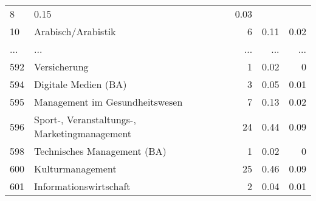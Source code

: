 \begin{longtable}{lXrrr}
          \num{8} &
          \num[round-mode=places,round-precision=2]{0,15} &
          \num[round-mode=places,round-precision=2]{0,03} \\
        10 & \multicolumn{1}{X}{Arabisch/Arabistik} & %
          \num{6} &
          \num[round-mode=places,round-precision=2]{0,11} &
          \num[round-mode=places,round-precision=2]{0,02} \\
       ... & ... & ... & ... & ... \\
        592 & \multicolumn{1}{X}{Versicherung} & %
          \num{1} &
          \num[round-mode=places,round-precision=2]{0,02} &
          \num[round-mode=places,round-precision=2]{0} \\

        594 & \multicolumn{1}{X}{Digitale Medien (BA)} & %
          \num{3} &
          \num[round-mode=places,round-precision=2]{0,05} &
          \num[round-mode=places,round-precision=2]{0,01} \\

        595 & \multicolumn{1}{X}{Management im Gesundheitswesen} & %
          \num{7} &
          \num[round-mode=places,round-precision=2]{0,13} &
          \num[round-mode=places,round-precision=2]{0,02} \\

        596 & \multicolumn{1}{X}{Sport-, Veranstaltungs-, Marketingmanagement} & %
          \num{24} &
          \num[round-mode=places,round-precision=2]{0,44} &
          \num[round-mode=places,round-precision=2]{0,09} \\

        598 & \multicolumn{1}{X}{Technisches Management (BA)} & %
          \num{1} &
          \num[round-mode=places,round-precision=2]{0,02} &
          \num[round-mode=places,round-precision=2]{0} \\

        600 & \multicolumn{1}{X}{Kulturmanagement} & %
          \num{25} &
          \num[round-mode=places,round-precision=2]{0,46} &
          \num[round-mode=places,round-precision=2]{0,09} \\

        601 & \multicolumn{1}{X}{Informationswirtschaft} & %
          \num{2} &
          \num[round-mode=places,round-precision=2]{0,04} &
          \num[round-mode=places,round-precision=2]{0,01} \\


\end{longtable}
